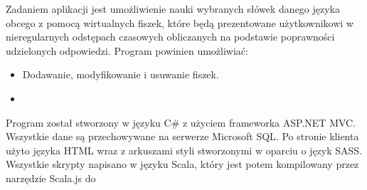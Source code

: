 Zadaniem aplikacji jest umożliwienie nauki wybranych słówek danego języka obcego z pomocą wirtualnych fiszek, które będą prezentowane użytkownikowi w nieregularnych odstępach czasowych obliczanych na podstawie poprawności udzielonych odpowiedzi.
Program powinien umożliwiać:
\begin{itemize}
	\item Dodawanie, modyfikowanie i usuwanie fiszek.
	\item 
\end{itemize}


Program został stworzony w języku C\# z użyciem frameworka ASP.NET MVC. Wszystkie dane są przechowywane na serwerze Microsoft SQL. Po stronie klienta użyto języka HTML wraz z arkuszami styli stworzonymi w oparciu o język SASS. Wszystkie skrypty napisano w języku Scala, który jest potem kompilowany przez narzędzie Scala.js do 